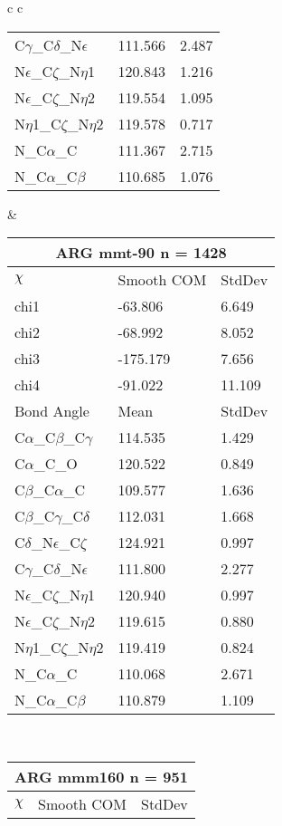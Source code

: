 \begin{longtable}{ c c }
\begin{tabular}{ l l l }
  C$\gamma$\_C$\delta$\_N$\epsilon$ & 111.566 & 2.487\\
  N$\epsilon$\_C$\zeta$\_N$\eta$1 & 120.843 & 1.216\\
  N$\epsilon$\_C$\zeta$\_N$\eta$2 & 119.554 & 1.095\\
  N$\eta$1\_C$\zeta$\_N$\eta$2 & 119.578 & 0.717\\
  N\_C$\alpha$\_C & 111.367 & 2.715\\
  N\_C$\alpha$\_C$\beta$ & 110.685 & 1.076\\
  \bottomrule
  \end{tabular}
  &
  \begin{tabular}{ l l l }
  \toprule
  \multicolumn{3}{c}{ARG \textbf{mmt-90} n = 1428} \\ \toprule
  $\chi$       & Smooth COM & StdDev \\ \midrule
  chi1 & -63.806 & 6.649 \\ 
  chi2 & -68.992 & 8.052 \\ 
  chi3 & -175.179 & 7.656 \\ 
  chi4 & -91.022 & 11.109 \\ \midrule
  Bond Angle   & Mean     & StdDev \\ \midrule
  C$\alpha$\_C$\beta$\_C$\gamma$ & 114.535 & 1.429\\
  C$\alpha$\_C\_O & 120.522 & 0.849\\
  C$\beta$\_C$\alpha$\_C & 109.577 & 1.636\\
  C$\beta$\_C$\gamma$\_C$\delta$ & 112.031 & 1.668\\
  C$\delta$\_N$\epsilon$\_C$\zeta$ & 124.921 & 0.997\\
  C$\gamma$\_C$\delta$\_N$\epsilon$ & 111.800 & 2.277\\
  N$\epsilon$\_C$\zeta$\_N$\eta$1 & 120.940 & 0.997\\
  N$\epsilon$\_C$\zeta$\_N$\eta$2 & 119.615 & 0.880\\
  N$\eta$1\_C$\zeta$\_N$\eta$2 & 119.419 & 0.824\\
  N\_C$\alpha$\_C & 110.068 & 2.671\\
  N\_C$\alpha$\_C$\beta$ & 110.879 & 1.109\\
  \bottomrule
  \end{tabular}
  \\
  \begin{tabular}{ l l l }
  \toprule
  \multicolumn{3}{c}{ARG \textbf{mmm160} n = 951} \\ \toprule
  $\chi$       & Smooth COM & StdDev \\ \midrule

\end{tabular}
\end{longtable}

